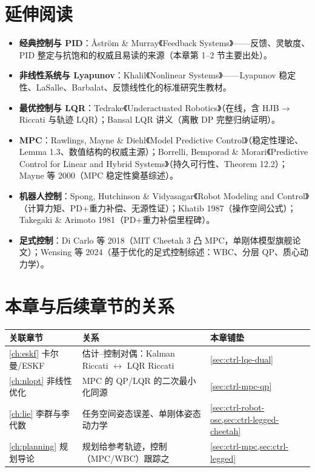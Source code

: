 \section*{延伸阅读}
\begin{itemize}
  \item \textbf{经典控制与 PID}：Åström \& Murray《Feedback Systems》\cite{astrom2008feedback}——反馈、灵敏度、PID 整定与抗饱和的权威且易读的来源（本章第 1--2 节主要出处）。
  \item \textbf{非线性系统与 Lyapunov}：Khalil《Nonlinear Systems》\cite{khalil2002nonlinear}——Lyapunov 稳定性、LaSalle、Barbalat、反馈线性化的标准研究生教材。
  \item \textbf{最优控制与 LQR}：Tedrake《Underactuated Robotics》\cite{tedrake_underactuated}（在线，含 HJB$\to$Riccati 与轨迹 LQR）；Bansal LQR 讲义\cite{bansal2017lqr}（离散 DP 完整归纳证明）。
  \item \textbf{MPC}：Rawlings, Mayne \& Diehl《Model Predictive Control》\cite{rawlings2020mpc}（稳定性理论、Lemma 1.3、数值结构的权威主源）；Borrelli, Bemporad \& Morari《Predictive Control for Linear and Hybrid Systems》\cite{borrelli2017predictive}（持久可行性、Theorem 12.2）；Mayne 等 2000\cite{mayne2000constrained}（MPC 稳定性奠基综述）。
  \item \textbf{机器人控制}：Spong, Hutchinson \& Vidyasagar《Robot Modeling and Control》\cite{spong2006robot}（计算力矩、PD+重力补偿、无源性证）；Khatib 1987\cite{khatib1987operational}（操作空间公式）；Takegaki \& Arimoto 1981\cite{takegaki1981feedback}（PD+重力补偿里程碑）。
  \item \textbf{足式控制}：Di Carlo 等 2018\cite{dicarlo2018cheetah}（MIT Cheetah 3 凸 MPC，单刚体模型旗舰论文）；Wensing 等 2024\cite{wensing2024legged}（基于优化的足式控制综述：WBC、分层 QP、质心动力学）。
\end{itemize}

\section*{本章与后续章节的关系}
\begin{table}[H]\centering\small
\begin{tabular}{lll}
\toprule
关联章节 & 关系 & 本章铺垫 \\
\midrule
\cref{ch:eskf} 卡尔曼/ESKF & 估计--控制对偶：Kalman Riccati $\leftrightarrow$ LQR Riccati & \cref{sec:ctrl-lqe-dual} \\
\cref{ch:nlopt} 非线性优化 & MPC 的 QP/LQR 的二次最小化同源 & \cref{sec:ctrl-mpc-qp} \\
\cref{ch:lie} 李群与李代数 & 任务空间姿态误差、单刚体姿态动力学 & \cref{sec:ctrl-robot-osc,sec:ctrl-legged-cheetah} \\
\cref{ch:planning} 规划导论 & 规划给参考轨迹，控制（MPC/WBC）跟踪之 & \cref{sec:ctrl-mpc,sec:ctrl-legged} \\
\bottomrule
\end{tabular}
\end{table}

